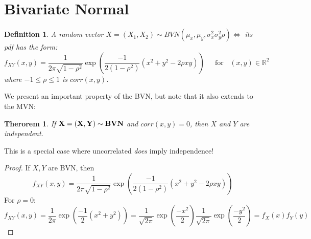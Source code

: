 \documentclass[12pt]{article} %
\newtheorem{defn}{Definition}
\newtheorem{thm}{Therorem}
\begin{document}
\section{Bivariate Normal}
\begin{defn}
A random vector $X=(X_1,X_2) \sim BVN(\mu_x,\mu_y,\sigma_x^2\sigma_y^2\rho) \iff$ its pdf has the form:
$$f_{XY}(x,y) = \frac{
1}{2\pi\sqrt{1-\rho^2}} \exp\left(\frac{-1}{2(1-\rho^2)}\left(x^2+y^2 -2\rho x y\right)\right)\;\;\;\; \textrm{ for } \;\; (x,y) \in \mathbb{R}^2$$
where $-1\leq \rho\leq 1$ is $corr(x,y)$.
\end{defn}
We present an important property of the BVN, but note that it also extends to the MVN:
\begin{thm}
If $\bf{X}=(X,Y)\sim BVN$ and $corr(x,y)=0$, then $X$ and $Y$ are independent.
\end{thm}
This is a special case where uncorrelated \emph{does} imply independence!
\begin{proof}
If $X,Y$ are BVN, then  
$$f_{XY}(x,y) =  \frac{
1}{2\pi\sqrt{1-\rho^2}} \exp\left(\frac{-1}{2(1-\rho^2)}\left(x^2+y^2 -2\rho x y\right)\right)$$
For $\rho=0:$
$$f_{XY}(x,y) =  \frac{
1}{2\pi} \exp\left(\frac{-1}{2}\left(x^2+y^2\right)\right) = \frac{1}{\sqrt{2\pi}}\exp\left(\frac{-x^2}{2}\right)\frac{1}{\sqrt{2\pi}}\exp\left(\frac{-y^2}{2}\right) = f_X(x)f_Y(y)$$
\end{proof}
\end{document}
